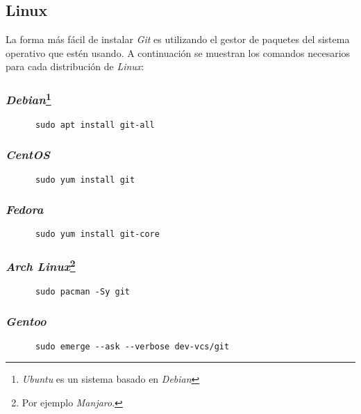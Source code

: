 \subsection{Linux}
  La forma más fácil de instalar \textit{Git} es utilizando el gestor de paquetes del
  sistema operativo que estén usando.
  A continuación se muestran los comandos necesarios para cada distribución de 
  \textit{Linux}:

  \subsubsection{
    \textit{Debian}\footnote{\textit{Ubuntu} es un sistema basado en \textit{Debian}}
  }
    \begin{verbatim}
      sudo apt install git-all 
    \end{verbatim}

  \subsubsection{\textit{CentOS}}
    \begin{verbatim}
      sudo yum install git
    \end{verbatim}

  \subsubsection{\textit{Fedora}}
    \begin{verbatim}
      sudo yum install git-core
    \end{verbatim}

  \subsubsection{\textit{Arch Linux}\footnote{Por ejemplo \textit{Manjaro}.}}
    \begin{verbatim}
      sudo pacman -Sy git
    \end{verbatim}

  \subsubsection{\textit{Gentoo}}
    \begin{verbatim}
      sudo emerge --ask --verbose dev-vcs/git
    \end{verbatim}
%